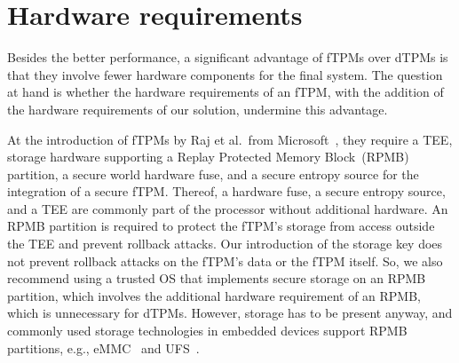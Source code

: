 





\section{Hardware requirements}

Besides the better performance, a significant advantage of \acp{fTPM} over \acp{dTPM} is that they involve fewer hardware components for the final system.
The question at hand is whether the hardware requirements of an fTPM, with the addition of the hardware requirements of our solution, undermine this advantage.

At the introduction of \acp{fTPM} by Raj et al.\ from Microsoft~\cite{Raj2015}, they require a TEE, storage hardware supporting a Replay Protected Memory Block~(RPMB) partition, a secure world hardware fuse, and a secure entropy source for the integration of a secure \ac{fTPM}\@.
Thereof, a hardware fuse, a secure entropy source, and a TEE are commonly part of the processor without additional hardware.
An RPMB partition is required to protect the fTPM's storage from access outside the TEE and prevent rollback attacks.
Our introduction of the storage key does not prevent rollback attacks on the fTPM's data or the fTPM itself.
So, we also recommend using a trusted OS that implements secure storage on an RPMB partition, which involves the additional hardware requirement of an RPMB, which is unnecessary for \acp{dTPM}.
However, storage has to be present anyway, and commonly used storage technologies in embedded devices support RPMB partitions, e.g., eMMC~\cite{eMMC} and UFS~\cite{UFS}.

